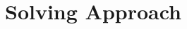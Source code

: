 \documentclass[aspectratio=1610]{beamer}
\let\oldfootnotesize\footnotesize
\renewcommand*{\footnotesize}{\oldfootnotesize\fontsize{6}{4}\selectfont}
\renewcommand{\footnotesize}{\scriptsize}
\begin{document}
  

  





\section{Solving Approach}

\end{document}
